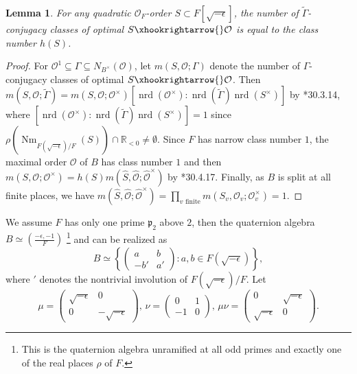 \documentclass{amsart}
\numberwithin{equation}{subsection}
\numberwithin{theorem}{section}
\newtheorem{lemma}[theorem]{Lemma}
\theoremstyle{definition}
\theoremstyle{remark}
\newcommand{\bR}{\mathbb{R}}
\newcommand{\cO}{\mathcal{O}}
\newcommand{\fp}{\mathfrak{p}}
\DeclareMathOperator{\Nm}{Nm}
\DeclareMathOperator{\nrd}{nrd}
\begin{document}
\begin{lemma}\label{lem:onegeo}
    For any quadratic $\cO_F$-order $S\subset F[\sqrt{-\epsilon}]$, the number of  $\widetilde{\Gamma}$-conjugacy classes of optimal $S\xhookrightarrow{}\cO$ is equal to the class number $h(S)$. 
\end{lemma}
\begin{proof}
    For $\cO^1\subseteq \Gamma \subseteq N_{B^\times}(\cO)$, let $m(S, \cO; \Gamma)$ denote the number of $\Gamma$-conjugacy classes of optimal $S\xhookrightarrow{}\cO$. Then $m(S, \cO; \widetilde{\Gamma}) = m(S, \cO; \cO^\times)[\nrd(\cO^\times):\nrd(\widetilde{\Gamma}) \nrd(S^\times)]$ by \cite{MR4279905}*{30.3.14}, where $[\nrd(\cO^\times):\nrd(\widetilde{\Gamma}) \nrd(S^\times)] = 1$ since $\rho(\Nm_{F(\sqrt{-\epsilon})/F}(S))\cap\bR_{<0}\neq \emptyset$. Since $F$ has narrow class number $1$, the maximal order $\cO$ of $B$ has class number $1$ and then $m(S, \cO; \cO^\times) = h(S) m(\widehat{S}, \widehat{\cO}; \widehat{\cO}^\times)$ by \cite{MR4279905}*{30.4.17}. Finally, as $B$ is split at all finite places, we have $m(\widehat{S}, \widehat{\cO}; \widehat{\cO}^\times) = \prod_{v \text{ finite}} m(S_v, \cO_v; \cO_v^\times) =  1$.
\end{proof}

We assume $F$ has only one prime $\fp_2$ above $2$, then the quaternion algebra $B \simeq \left(\frac{-\epsilon, -1}{F}\right)$ \footnote{This is the quaternion algebra unramified at all odd primes and exactly one of the real places $\rho$ of $F$.} and can be realized as \[B \simeq \left\{\begin{pmatrix}
    a & b \\ -b' & a'
\end{pmatrix}: a,b \in F(\sqrt{-\epsilon})\right\},\]  where $'$ denotes the nontrivial involution of $F(\sqrt{-\epsilon})/F$. 
Let \[\mu = \begin{pmatrix}
    \sqrt{-\epsilon} & 0 \\ 0 & -\sqrt{-\epsilon}
\end{pmatrix}, \, \nu = \begin{pmatrix}
    0 & 1 \\ -1 & 0
\end{pmatrix}, \, \mu\nu = \begin{pmatrix}
    0 & \sqrt{-\epsilon} \\ \sqrt{-\epsilon} & 0
\end{pmatrix}.\] 
\end{document}
